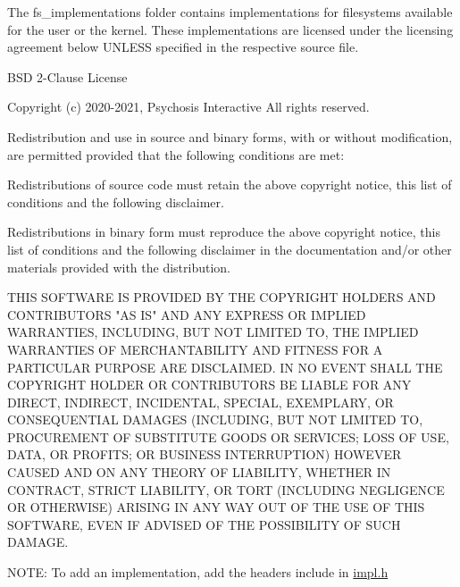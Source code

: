 The fs\+\_\+implementations folder contains implementations for filesystems available for the user or the kernel. These implementations are licensed under the licensing agreement below U\+N\+L\+E\+SS specified in the respective source file.


\begin{DoxyCode}
BSD 2-Clause License

Copyright (c) 2020-2021, Psychosis Interactive All rights reserved.

Redistribution and use in source and binary forms, with or without modification, are permitted provided
       that the following conditions are met:

Redistributions of source code must retain the above copyright notice, this list of conditions and the
       following disclaimer.

Redistributions in binary form must reproduce the above copyright notice, this list of conditions and the
       following disclaimer in the documentation and/or other materials provided with the distribution.

THIS SOFTWARE IS PROVIDED BY THE COPYRIGHT HOLDERS AND CONTRIBUTORS "AS IS" AND ANY EXPRESS OR IMPLIED
       WARRANTIES, INCLUDING, BUT NOT LIMITED TO, THE IMPLIED WARRANTIES OF MERCHANTABILITY AND FITNESS FOR A
       PARTICULAR PURPOSE ARE DISCLAIMED. IN NO EVENT SHALL THE COPYRIGHT HOLDER OR CONTRIBUTORS BE LIABLE FOR ANY DIRECT,
       INDIRECT, INCIDENTAL, SPECIAL, EXEMPLARY, OR CONSEQUENTIAL DAMAGES (INCLUDING, BUT NOT LIMITED TO,
       PROCUREMENT OF SUBSTITUTE GOODS OR SERVICES; LOSS OF USE, DATA, OR PROFITS; OR BUSINESS INTERRUPTION) HOWEVER CAUSED
       AND ON ANY THEORY OF LIABILITY, WHETHER IN CONTRACT, STRICT LIABILITY, OR TORT (INCLUDING NEGLIGENCE OR
       OTHERWISE) ARISING IN ANY WAY OUT OF THE USE OF THIS SOFTWARE, EVEN IF ADVISED OF THE POSSIBILITY OF SUCH DAMAGE.
\end{DoxyCode}


N\+O\+TE\+: To add an implementation, add the headers include in {\ttfamily \hyperlink{a00161}{impl.\+h}} 